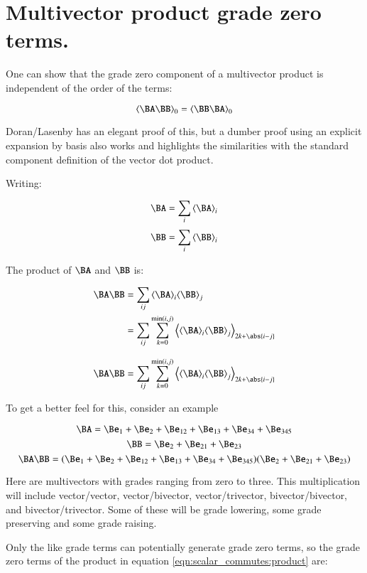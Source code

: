 \chapter{Multivector product grade zero terms.}

One can show that the grade zero component of a multivector product 
is independent of the order of the terms:

\begin{equation}
\gpgradezero{\BA \BB} = \gpgradezero{\BB \BA}
\end{equation}

Doran/Lasenby has an elegant proof of this, but a dumber proof using an
explicit expansion by basis also works and highlights the similarities
with the standard component definition of the vector dot product.

Writing:

\[
\BA = \sum_i \gpgrade{\BA}{i}
\]
\[
\BB = \sum_i \gpgrade{\BB}{i}
\]

The product of $\BA$ and $\BB$ is:

\begin{align*}
\BA \BB 
&= \sum_{ij} \gpgrade{\BA}{i} \gpgrade{\BB}{j} \\
&= \sum_{ij} \sum_{k=0}^{\min(i,j)}\gpgrade{\gpgrade{\BA}{i} \gpgrade{\BB}{j}}{2k + \abs{i-j}} \\
\end{align*}

\begin{equation}\label{eqn:scalar_commutes:product}
\BA \BB 
= \sum_{ij} \sum_{k=0}^{\min(i,j)}\gpgrade{\gpgrade{\BA}{i} \gpgrade{\BB}{j}}{2k + \abs{i-j}} 
\end{equation}

To get a better feel for this, consider an example

\[
\BA = \Be_1 + \Be_2 + \Be_{12} + \Be_{13} + \Be_{34} + \Be_{345}
\]
\[
\BB = \Be_2 + \Be_{21} + \Be_{23}
\]
\[
\BA \BB = ( \Be_1 + \Be_2 + \Be_{12} + \Be_{13} + \Be_{34} + \Be_{345})(\Be_2 + \Be_{21} + \Be_{23})
\]

Here are multivectors with grades ranging from zero to three.  This multiplication will include vector/vector, vector/bivector, vector/trivector, bivector/bivector, and bivector/trivector.  Some of these will be grade lowering, some grade preserving and some grade raising.

Only the like grade terms can potentially generate grade zero terms, so the grade zero terms of the product in equation \ref{eqn:scalar_commutes:product} are:

